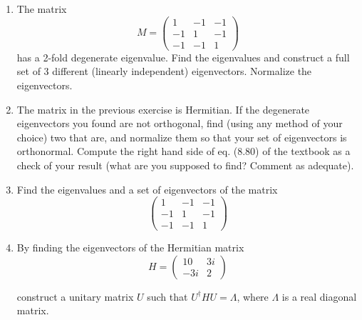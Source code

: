 \documentclass[fleqn]{article}
\begin{document}
\begin{enumerate}
    \item The matrix 
      $$M = 
      \begin{pmatrix}
      1 & -1 & -1 \\
      -1 & 1 & -1 \\
      -1 & -1 & 1
      \end{pmatrix}
      $$
      has a 2-fold degenerate eigenvalue. Find the eigenvalues and construct a full set of 3 different
      (linearly independent) eigenvectors. Normalize the eigenvectors.

    \item The matrix in the previous exercise is Hermitian. If the degenerate eigenvectors you found are not orthogonal, find (using any method of your choice) two that are, and normalize them so that your set of eigenvectors is orthonormal.
      Compute the right hand side of eq. (8.80) of the textbook as a check of your result (what are you supposed to find? Comment as adequate).

    \item Find the eigenvalues and a set of eigenvectors of the matrix
      $$ 
      \begin{pmatrix}
      1 & -1 & -1 \\
      -1 & 1 & -1 \\
      -1 & -1 & 1
      \end{pmatrix}
      $$

    
    \item By finding the eigenvectors of the Hermitian matrix
      $$H= 
      \begin{pmatrix}
      10 & 3i \\
      -3i & 2 
      \end{pmatrix}
      $$

      construct a unitary matrix $U$ such that $U^\dagger HU=\Lambda$, where $\Lambda$ is a real  diagonal matrix. 


  \end{enumerate}
\end{document}
